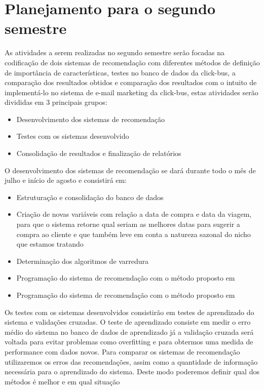 \chapter[Planejamento para o segundo semestre]{Planejamento para o segundo semestre}
\label{chap:Planejamento_para_o_segundo_semestre}

As atividades a serem realizadas no segundo semestre serão focadas na codificação de dois sistemas de recomendação com diferentes métodos de definição de importância de características, testes no banco de dados da click-bus, a comparação dos resultados obtidos e comparação dos resultados com o intuito de implementá-lo no sistema de e-mail marketing da click-bus, estas atividades serão divididas em 3 principais grupos:

\begin{itemize} 
	\item Desenvolvimento dos sistemas de recomendação
	\item Testes com os sistemas desenvolvido
	\item Consolidação de resultados e finalização de relatórios
\end{itemize}

O desenvolvimento dos sistemas de recomendação se dará durante todo o mês de julho e início de agosto e consistirá em:

\begin{itemize}
	\item Estruturação e consolidação do banco de dados
	\item Criação de novas variáveis com relação a data de compra e data da viagem, para que o sistema retorne qual seriam as melhores datas para sugerir a compra ao cliente e que também leve em conta a natureza sazonal do nicho que estamos tratando
	\item Determinação dos algoritmos de varredura
	\item Programação do sistema de recomendação com o método proposto em \cite{debnath2008feature}
	\item Programação do sistema de recomendação com o método proposto em \cite{symeonidis2007feature}
\end{itemize}

Os testes com os sistemas desenvolvidos consistirão em testes de aprendizado do sistema e validações cruzadas. O teste de aprendizado consiste em medir o erro médio do sistema no banco de dados de aprendizado já a validação cruzada será voltada para evitar problemas como overfitting e para obtermos uma medida de performance com dados novos. Para comparar os sistemas de recomendação utilizaremos os erros das recomendações, assim como a quantidade de informação necessária para o aprendizado do sistema. Deste modo poderemos definir qual dos métodos é melhor e em qual situação

